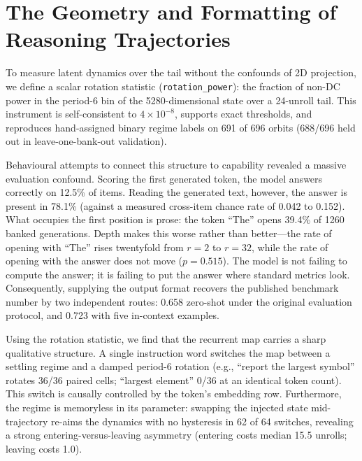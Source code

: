 \section*{The Geometry and Formatting of Reasoning Trajectories}


To measure latent dynamics over the tail without the confounds of 2D projection, we define a scalar rotation statistic (\texttt{rotation\_power}): the fraction of non-DC power in the period-6 bin of the 5280-dimensional state over a 24-unroll tail. This instrument is self-consistent to $4\times10^{-8}$, supports exact thresholds, and reproduces hand-assigned binary regime labels on 691 of 696 orbits (688/696 held out in leave-one-bank-out validation).

Behavioural attempts to connect this structure to capability revealed a massive evaluation confound. Scoring the first generated token, the model answers correctly on 12.5\% of items. Reading the generated text, however, the answer is present in 78.1\% (against a measured cross-item chance rate of 0.042 to 0.152). What occupies the first position is prose: the token ``The'' opens 39.4\% of 1260 banked generations. Depth makes this worse rather than better---the rate of opening with ``The'' rises twentyfold from $r = 2$ to $r = 32$, while the rate of opening with the answer does not move ($p = 0.515$). The model is not failing to compute the answer; it is failing to put the answer where standard metrics look. Consequently, supplying the output format recovers the published benchmark number by two independent routes: 0.658 zero-shot under the original evaluation protocol, and 0.723 with five in-context examples.


Using the rotation statistic, we find that the recurrent map carries a sharp qualitative structure. A single instruction word switches the map between a settling regime and a damped period-6 rotation (e.g., ``report the largest symbol'' rotates 36/36 paired cells; ``largest element'' 0/36 at an identical token count). This switch is causally controlled by the token's embedding row. Furthermore, the regime is memoryless in its parameter: swapping the injected state mid-trajectory re-aims the dynamics with no hysteresis in 62 of 64 switches, revealing a strong entering-versus-leaving asymmetry (entering costs median 15.5 unrolls; leaving costs 1.0).

